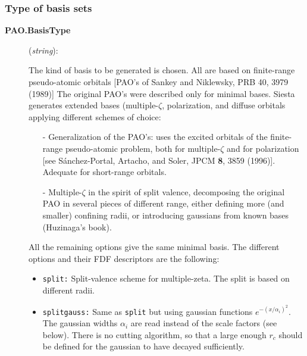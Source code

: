 \documentclass[11pt]{article}
\begin{document}
\subsubsection{Type of basis sets}

\begin{description}

\item[{\bf PAO.BasisType}] ({\it string}): 

The kind of basis to be generated is chosen. All are based on
finite-range pseudo-atomic orbitals [PAO's of Sankey and Niklewsky, PRB 40, 3979 (1989)] The
original PAO's were described only for minimal bases. {\sc Siesta}
generates extended bases (multiple-$\zeta$,
polarization, and diffuse
orbitals applying different schemes of choice:

\begin{itemize}

\item[-] Generalization of the PAO's: uses the excited orbitals of the
finite-range pseudo-atomic problem, both for multiple-$\zeta$ and for
polarization [see S\'anchez-Portal, Artacho, and Soler, JPCM {\bf 8},
3859 (1996)]. Adequate for short-range orbitals.

\item[-] Multiple-$\zeta$ in the spirit of split valence, decomposing the original PAO in several pieces of different
range, either defining more (and smaller) confining radii, or
introducing gaussians from known bases (Huzinaga's
book).
\end{itemize}

\noindent
All the remaining options
give the same minimal basis. 
The different options and their FDF descriptors are the following:

\begin{itemize}

\item {\tt split:} Split-valence scheme for multiple-zeta.
The split is based on different radii. 

\item {\tt splitgauss:}
Same as {\tt split} but using gaussian functions
$e^{-(x/\alpha_i)^2}$. The gaussian widths $\alpha_i$ are read instead 
of the scale factors (see below). There is no cutting algorithm, so that
a large enough $r_c$ should be defined for the gaussian to have decayed
sufficiently.


\end{itemize}
\end{description}
\end{document}
